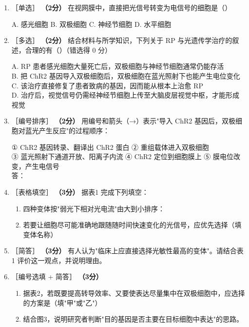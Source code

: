 \documentclass[UTF8,a4paper,11pt]{ctexart}
\newcommand{\pt}[1]{\textbf{（#1分）}}
\newcommand{\tg}[1]{{\small\color{deepgreen}［#1］}}
\newcommand{\tian}[1]{\underline{\hspace{#1}}}
\newcommand{\choice}[1]{\par\smallskip\noindent #1\par}
\begin{document}
\begin{enumerate}[leftmargin=2.1em,itemsep=5pt]
\item \tg{单选} \pt{2} 在视网膜中，直接把光信号转变为电信号的细胞是（\quad）\\
\choice{A. 感光细胞 \quad B. 双极细胞 \quad C. 神经节细胞 \quad D. 水平细胞}

\item \tg{多选} \pt{2} 结合材料与所学知识，下列关于 RP 与光遗传学治疗的叙述，合理的有（\quad）（错选得 0 分）\\
\choice{A. RP 患者感光细胞大量死亡后，双极细胞与神经节细胞通常仍能存活\\
B. 把 ChR2 基因导入双极细胞后，双极细胞在蓝光照射下也能产生电位变化\\
C. 该治疗直接修复了患者致病的基因，因而能从根本上治愈 RP\\
D. 治疗后，视觉信号仍需经神经节细胞上传至大脑皮层视觉中枢，才能形成视觉}

\item \tg{编号排序} \pt{2} 用编号和箭头（→）表示"导入 ChR2 基因后，双极细胞对蓝光产生反应"的过程顺序：\\
\choice{① ChR2 基因转录、翻译出 ChR2 蛋白 \quad ② 重组载体进入双极细胞\\
③ 蓝光照射下通道开放、阳离子内流 \quad ④ ChR2 定位到细胞膜上 \quad ⑤ 膜电位改变，产生电信号\\
答：\tian{7.2cm}}

\item \tg{表格填空} \pt{3} 据表1 完成下列填空：
\begin{enumerate}[label=(\arabic*),leftmargin=1.4em,itemsep=2pt]
\item 四种变体按"弱光下相对光电流"由大到小排序：\tian{6.6cm}
\item 若要让细胞尽可能准确地跟随随时间快速变化的光信号，应优先选择\tian{2.4cm}（填变体名称）
\end{enumerate}

\item \tg{简答} \pt{3} 有人认为"临床上应直接选择光敏性最高的变体"。请结合表1 评价这一观点，并说明理由。

\item \tg{编号选填 + 简答} \pt{3}
\begin{enumerate}[label=(\arabic*),leftmargin=1.4em,itemsep=2pt]
\item 据表2，若既要提高转导效率、又要使表达尽量集中在双极细胞中，应选择的方案是\tian{0.8cm}（填"甲"或"乙"）
\item 结合图3，说明研究者判断"目的基因是否主要在目标细胞中表达"的思路。
\end{enumerate}


\end{enumerate}
\end{document}
